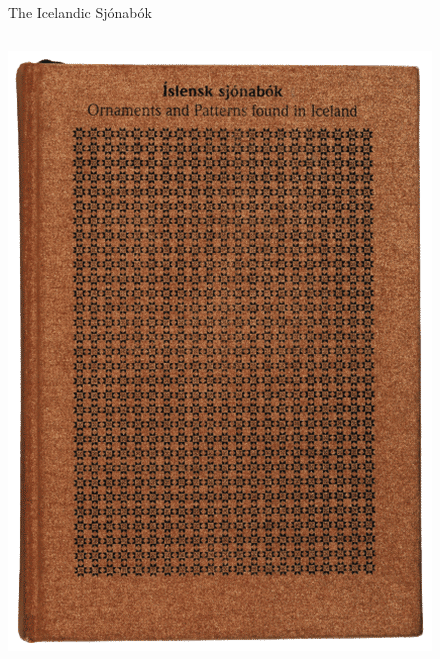 \documentclass[
    NAME={Dr. Helga Ingimundardóttir},
    EMAIL={helgaingim@hi.is},
    FACULTY={Industrial Engineering},
    TITLE={HiDef Textiles: Reviving Tradition with Innovation},
    SUBTITLE={Empowering Creativity and Sustainability in Textile Production through Digital Transformation},
    SEMINAR={Reykjavík DataBeers},
    DATE={January 25, 2025},
    WIDE={true}
]{HI-LaTeX/hi-beamer}
\begin{document}
\begin{frame}[allowframebreaks]{The Icelandic Sjónabók}
\begin{columns}
            \begin{column}{0.3\textwidth}
                \includegraphics[width=\textwidth]{include/sjónabók.png}
            \end{column}
        \end{columns}

        \framebreak


\end{frame}
\end{document}
